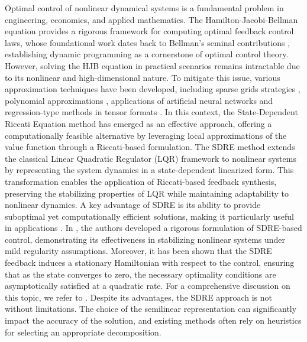 \documentclass{article}
\begin{document}
    
Optimal control of nonlinear dynamical systems is a fundamental problem in engineering, economics, and applied mathematics. The Hamilton-Jacobi-Bellman equation provides a rigorous framework for computing optimal feedback control laws, whose foundational work dates back to Bellman’s seminal contributions \cite{bellman1957}, establishing dynamic programming as a cornerstone of optimal control theory. However, solving the HJB equation in practical scenarios remains intractable due to its nonlinear and high-dimensional nature. To mitigate this issue, various approximation techniques have been developed, including sparse grids strategies \cite{GK16}, polynomial approximations \cite{kunisch2023learning,kalise2018polynomial}, applications of artificial neural networks \cite{Darbon_Langlois_Meng_2020,Kunisch_Walter_2021,Zhou_2021} and regression-type methods in tensor formats \cite{oster22,dolgov2023data}.
In this context, the State-Dependent Riccati Equation method has emerged as an effective approach, offering a computationally feasible alternative by leveraging local approximations of the value function through a Riccati-based formulation. The SDRE method extends the classical Linear Quadratic Regulator (LQR) framework to nonlinear systems by representing the system dynamics in a state-dependent linearized form. This transformation enables the application of Riccati-based feedback synthesis, preserving the stabilizing properties of LQR while maintaining adaptability to nonlinear dynamics. A key advantage of SDRE is its ability to provide suboptimal yet computationally efficient solutions, making it particularly useful in applications \cite{voos2006nonlinear,vaddi2009numerical,heiland2023low}.
In \cite{banks2007}, the authors developed a rigorous formulation of SDRE-based control, demonstrating its effectiveness in stabilizing nonlinear systems under mild regularity assumptions. Moreover, it has been shown that the SDRE feedback induces a stationary Hamiltonian with respect to the control, ensuring that as the state converges to zero, the necessary optimality conditions are asymptotically satisfied at a quadratic rate. For a comprehensive discussion on this topic, we refer to \cite{CIMEN,cloutier1996nonlinear}.
Despite its advantages, the SDRE approach is not without limitations. The choice of the semilinear representation can significantly impact the accuracy of the solution, and existing methods often rely on heuristics for selecting an appropriate decomposition. 
\end{document}
